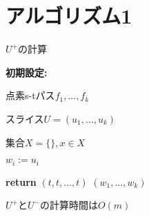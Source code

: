 \documentclass{jarticle}
\theoremstyle{definition}
\begin{document}
\section*{アルゴリズム1}

\begin{algorithm}[H]
        \caption{$U^+$の計算} 
        \textbf{初期設定:} \par
        点素s-tパス$f_1,...,f_k$ \par
        スライス$U=(u_1,...,u_k)$ \par
        集合$X=\{\},x\in X$ \par 
        $w_i := u_i$ \Comment {}\par
        {\setlength{\baselineskip}{10pt}
        \begin{algorithmic}[1]
           
          \EndFor
            \State \textbf{return} $(t,t,...,t)$
            \Else 
            \EndIf
          \EndWhile
           $(w_1,...,w_k)$
        \end{algorithmic}
        }
\end{algorithm}
$U^+$と$U^-$の計算時間は$O(m)$

\begin{comment}
\section*{分散案1}

\begin{enumerate}
  \item 各$u_i$は$w_i:=u_i$としてパスに沿って$s$方向に送信
  \item ノード$s$から$w_i$のインデックスをブロードキャスト
  \item 受信するノードがs-tパス上にある時、そのノードは$w_i$の値を更新してパスに沿って$s$方向にのみ送信
  \item 受信した$w_i$の値がパス上の自身のインデックスと等しいとき、$w_i$をグラフ全体にブロードキャスト($u_i$の時は除外)
  \item $t$が値を受信したとき、$w_i:=t$としてグラフ全体にブロードキャスト
\end{enumerate}
$O(kn)$ラウンドで実行可能（？）
\end{comment}
\end{document}

